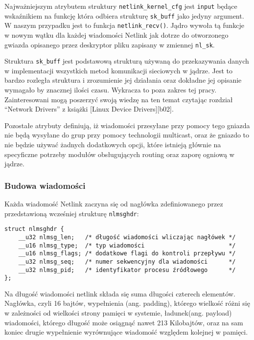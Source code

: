 \documentclass[10pt]{article}
\begin{document}
Najważniejszym atrybutem struktury \texttt{netlink\_kernel\_cfg} jest \texttt{input} będące wskaźnikiem na funkcję która odbiera strukturę \texttt{sk\_buff} jako jedyny argument. W naszym przypadku jest to funkcja \texttt{netlink\_recv()}. Jądro wywoła tą funkcje w nowym wątku dla każdej wiadomości Netlink jak dotrze do otworzonego gwiazda opisanego przez deskryptor pliku zapisany w zmiennej \texttt{nl\_sk}.

Struktura \texttt{sk\_buff} jest podstawową strukturą używaną do przekazywania danych w implementacji wszystkich metod komunikacji sieciowych w jądrze. Jest to bardzo rozległa struktura i zrozumienie jej działania oraz dokładne jej opisanie wymagało by znacznej ilości czasu.  Wykracza to poza zakres tej pracy. Zainteresowani mogą poszerzyć swoją wiedzę na ten temat czytając rozdział ``Network Drivers'' z książki {[}Linux Device Drivers{]}{[}b02{]}.

Pozostałe atrybuty definiują, iż wiadomości przesyłane przy pomocy tego gniazda nie będą wysyłane do grup przy pomocy technologii multicast, oraz że gniazdo to nie będzie używać żadnych dodatkowych opcji, które istnieją głównie na specyficzne potrzeby modułów obsługujących routing oraz zaporę ogniową w jądrze.

\subsubsection{Budowa wiadomości}

Każda wiadomość Netlink zaczyna się od nagłówka zdefiniowanego przez przedstawioną wcześniej strukturę \texttt{nlmsghdr}:

\begin{verbatim}
struct nlmsghdr {
    __u32 nlmsg_len;   /* długość wiadomości wliczając nagłówek */
    __u16 nlmsg_type;  /* typ wiadomości                        */
    __u16 nlmsg_flags; /* dodatkowe flagi do kontroli przepływu */
    __u32 nlmsg_seq;   /* numer sekwencyjny dla wiadomości      */
    __u32 nlmsg_pid;   /* identyfikator procesu źródłowego      */
};
\end{verbatim}

Na długość wiadomości netlink składa się suma długości czterech elementów. Nagłówka, czyli 16 bajtów, wypełnienia (ang. padding), którego wielkość różni się w zależności od wielkości strony pamięci w systemie, ładunek(ang. payload) wiadomości, którego długość może osiągnąć nawet 213 Kilobajtów, oraz na sam koniec drugie wypełnienie wyrównujące wiadomość względem kolejnej w pamięci.
\end{document}
